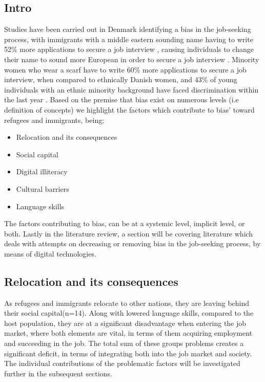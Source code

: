 \subsection{Intro}
Studies have been carried out in Denmark identifying a bias in the job-seeking process, with immigrants with a middle eastern sounding name having to write 52\% more applications to secure a job interview \cite{Politiken}, causing individuals to change their name to sound more European in order to secure a job interview \cite{Afrodanskere}. Minority women who wear a scarf have to write 60\% more applications to secure a job interview, when compared to ethnically Danish women, and 43\% of young individuals with an ethnic minority background have faced discrimination within the last year \cite{Samvirke}. Based on the premise that bias exist on numerous levels (i.e definition of concepts) we highlight the factors which contribute to bias' toward refugees and immigrants, being;
\begin{itemize}
  \item Relocation and its consequences
  \item Social capital
  \item Digital illiteracy
  \item Cultural barriers
  \item Language skills
\end{itemize}
 The factors contributing to bias, can be at a systemic level, implicit level, or both. Lastly in the literature review, a section will be covering literature which deals with attempts on decreasing or removing bias in the job-seeking process, by means of digital technologies.

\subsection{Relocation and its consequences}
As refugees and immigrants relocate to other nations, they are leaving behind their social capital\cite{Almohamamed2018}(n=14). Along with lowered language skills\cite{Rockwool2013}, compared to the host population, they are at a significant disadvantage when entering the job market, where both elements are vital, in terms of them acquiring employment\cite{putnam2000bowling}\cite{aldridge2002social} and succeeding in the job. The total sum of these groups problems creates a significant deficit, in terms of integrating both into the job market and society. The individual contributions of the problematic factors will be investigated further in the subsequent sections.

